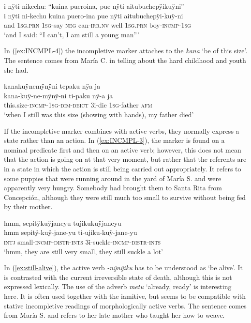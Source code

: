 \newpage
\ea\label{ex:INCMPL-5}
\begingl 
\glpreamble i nÿti nikechu: “kuina pueroina, pue nÿti aitubuchepÿikuÿni”\\
\gla i nÿti ni-kechu kuina puero-ina pue nÿti aitubuchepÿi-kuÿ-ni\\ 
\glb and 1\textsc{sg.prn} 1\textsc{sg}-say \textsc{neg} can-\textsc{irr.nv} well 1\textsc{sg.prn} boy-\textsc{incmp}-1\textsc{sg}\\ 
\glft ‘and I said: “I can’t, I am still a young man”’
\trailingcitation{[mqx-p110826l.386]}
\xe

In (\ref{ex:INCMPL-4}) the incompletive marker attaches to the  \textit{kana} ‘be of this size’. The sentence comes from María C. in telling about the hard childhood and youth she had.

\ea\label{ex:INCMPL-4}
\begingl
\glpreamble kanakuÿnemÿnÿni tepaku nÿa ja\\
\gla kana-kuÿ-ne-mÿnÿ-ni ti-paku nÿ-a ja\\
\glb this.size-\textsc{incmp}-1\textsc{sg}-\textsc{dim}-\textsc{deict} 3i-die 1\textsc{sg}-father \textsc{afm}\\
\glft ‘when I still was this size (showing with hands), my father died’
\endgl
\trailingcitation{[ump-p110815sf.149]}
\xe


If the incompletive marker combines with active verbs, they normally express a state rather than an action. In (\ref{ex:INCMPL-3}), the marker is found on a nominal predicate first and then on an active verb; however, this does not mean that the action is going on at that very moment, but rather that the referents are in a state in which the action is still being carried out appropriately. It refers to some puppies that were running around in the yard of María S. and were apparently very hungry. Somebody had brought them to Santa Rita from Concepción, although they were still much too small to survive without being fed by their mother.

\ea\label{ex:INCMPL-3}
\begingl 
\glpreamble hmm, sepitÿkuÿjaneyu tujikukuÿjaneyu\\
\gla hmm sepitÿ-kuÿ-jane-yu ti-ujiku-kuÿ-jane-yu\\ 
\glb \textsc{intj} small-\textsc{incmp}-\textsc{distr}-\textsc{ints} 3i-suckle-\textsc{incmp}-\textsc{distr}-\textsc{ints}\\ 
\glft ‘hmm, they are still very small, they still suckle a lot’
\trailingcitation{[rxx-e120511l.364]}
\xe


In (\ref{ex:still-alive}), the active verb \textit{-nÿnÿiku} has to be understood as ‘be alive’. It is contrasted with the current irreversible state of death, although this is not expressed lexically. The use of the adverb \textit{metu} ‘already, ready’ is interesting here. It is often used together with the iamitive, but seems to be compatible with stative incompletive readings of morphologically active verbs. The sentence comes from María S. and refers to her late mother who taught her how to weave.

